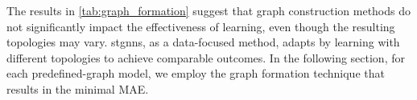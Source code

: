 


The results in \autoref{tab:graph_formation} suggest that graph construction methods do not significantly impact the effectiveness of learning, even though the resulting topologies may vary. \glspl{stgnn}, as a data-focused method, adapts by learning with different topologies to achieve comparable outcomes. In the following section, for each predefined-graph model, we employ the graph formation technique that results in the minimal MAE. 
